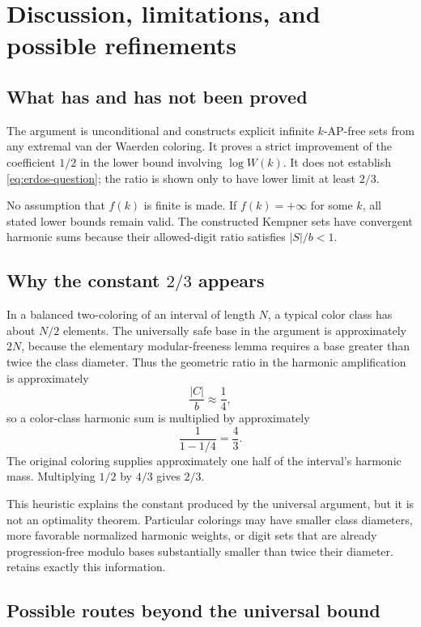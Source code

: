 \documentclass[11pt]{article}
\theoremstyle{definition}
\theoremstyle{remark}
\begin{document}
\section{Discussion, limitations, and possible refinements}

\subsection{What has and has not been proved}

The argument is unconditional and constructs explicit infinite
$k$-AP-free sets from any extremal van der Waerden coloring.  It proves a
strict improvement of the coefficient $1/2$ in the lower bound involving
$\log W(k)$.  It does not establish \cref{eq:erdos-question}; the ratio is
shown only to have lower limit at least $2/3$.

No assumption that $f(k)$ is finite is made.  If $f(k)=+\infty$ for some
$k$, all stated lower bounds remain valid.  The constructed Kempner sets
have convergent harmonic sums because their allowed-digit ratio satisfies
$|S|/b<1$.

\subsection{Why the constant \texorpdfstring{$2/3$}{2/3} appears}

In a balanced two-coloring of an interval of length $N$, a typical color
class has about $N/2$ elements.  The universally safe base in the argument
is approximately $2N$, because the elementary modular-freeness lemma
requires a base greater than twice the class diameter.  Thus the geometric
ratio in the harmonic amplification is approximately
\[
 \frac{|C|}{b}\approx\frac14,
\]
so a color-class harmonic sum is multiplied by approximately
\[
 \frac{1}{1-1/4}=\frac43.
\]
The original coloring supplies approximately one half of the interval's
harmonic mass.  Multiplying $1/2$ by $4/3$ gives $2/3$.

This heuristic explains the constant produced by the universal argument,
but it is not an optimality theorem.  Particular colorings may have smaller
class diameters, more favorable normalized harmonic weights, or digit sets
that are already progression-free modulo bases substantially smaller than
twice their diameter.   retains exactly this
information.

\subsection{Possible routes beyond the universal bound}
\end{document}
